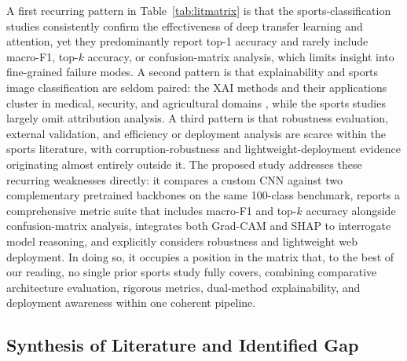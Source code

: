 A first recurring pattern in Table~\ref{tab:litmatrix} is that the sports-classification studies consistently confirm the effectiveness of deep transfer learning and attention, yet they predominantly report top-1 accuracy and rarely include macro-F1, top-$k$ accuracy, or confusion-matrix analysis, which limits insight into fine-grained failure modes.
A second pattern is that explainability and sports image classification are seldom paired: the XAI methods \citep{selvaraju2017gradcam,chattopadhay2018gradcampp,wang2020scorecam,lundberg2017shap} and their applications cluster in medical, security, and agricultural domains \citep{kumaran2024lungcam,nazim2025malware,karim2024grapeleaf,ahmed2024clothing}, while the sports studies \citep{liu2024comparison,li2024seres,zhou2024tuna,fu2024federated,bera2023finegrained} largely omit attribution analysis.
A third pattern is that robustness evaluation, external validation, and efficiency or deployment analysis are scarce within the sports literature, with corruption-robustness and lightweight-deployment evidence \citep{siedel2023corruption,ramirezagudelo2026noisy,isong2025lightweight,foysal2024plantleaf} originating almost entirely outside it.
The proposed study addresses these recurring weaknesses directly: it compares a custom CNN against two complementary pretrained backbones on the same 100-class benchmark, reports a comprehensive metric suite that includes macro-F1 and top-$k$ accuracy alongside confusion-matrix analysis, integrates both Grad-CAM and SHAP to interrogate model reasoning, and explicitly considers robustness and lightweight web deployment.
In doing so, it occupies a position in the matrix that, to the best of our reading, no single prior sports study fully covers, combining comparative architecture evaluation, rigorous metrics, dual-method explainability, and deployment awareness within one coherent pipeline.

\subsection{Synthesis of Literature and Identified Gap}
\label{subsec:synthesis}

